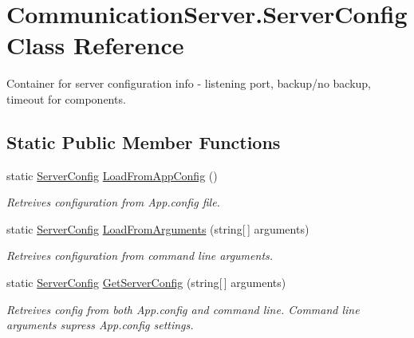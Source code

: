 \hypertarget{class_communication_server_1_1_server_config}{}\section{Communication\+Server.\+Server\+Config Class Reference}
\label{class_communication_server_1_1_server_config}


Container for server configuration info -\/ listening port, backup/no backup, timeout for components.  


\subsection*{Static Public Member Functions}
\begin{DoxyCompactItemize}
\item 
static \hyperlink{class_communication_server_1_1_server_config}{Server\+Config} \hyperlink{class_communication_server_1_1_server_config_a9dbbd02ff0f943fa1f7dead38726044c}{Load\+From\+App\+Config} ()
\begin{DoxyCompactList}\small\item\em Retreives configuration from App.\+config file. \end{DoxyCompactList}\item 
static \hyperlink{class_communication_server_1_1_server_config}{Server\+Config} \hyperlink{class_communication_server_1_1_server_config_a9f2f4705596c36cc3a07a9ee09a48bcc}{Load\+From\+Arguments} (string\mbox{[}$\,$\mbox{]} arguments)
\begin{DoxyCompactList}\small\item\em Retreives configuration from command line arguments. \end{DoxyCompactList}\item 
static \hyperlink{class_communication_server_1_1_server_config}{Server\+Config} \hyperlink{class_communication_server_1_1_server_config_adfbc64c9c40c2d78db84dd4a02d759fc}{Get\+Server\+Config} (string\mbox{[}$\,$\mbox{]} arguments)
\begin{DoxyCompactList}\small\item\em Retreives config from both App.\+config and command line. Command line arguments supress App.\+config settings. \end{DoxyCompactList}\end{DoxyCompactItemize}
